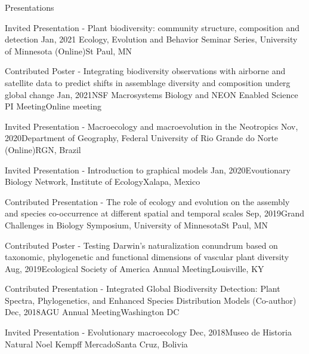 \documentclass{resume} %
\begin{document}
\begin{rSection}{Presentations}
\begin{sSubsection}{Invited Presentation - Plant biodiversity: community structure, composition and detection}{ }{Jan, 2021}{ Ecology, Evolution and Behavior Seminar Series, University of Minnesota (Online)}{St Paul, MN}
\end{sSubsection}

\begin{sSubsection}{Contributed Poster - Integrating biodiversity observations with airborne and satellite data to predict shifts in assemblage diversity and composition underg global change}{ }{Jan, 2021}{NSF Macrosystems Biology and NEON Enabled Science PI Meeting}{Online meeting}
\end{sSubsection}

\begin{sSubsection}{Invited Presentation - Macroecology and macroevolution in the Neotropics}{ }{Nov, 2020}{Department of Geography, Federal University of Rio Grande do Norte (Online)}{RGN, Brazil}
\end{sSubsection}

\begin{sSubsection}{Invited Presentation - Introduction to graphical models}{ }{Jan, 2020}{Evoutionary Biology Network, Institute of Ecology}{Xalapa, Mexico}
\end{sSubsection}

\begin{sSubsection}{Contributed Presentation - The role of ecology and evolution on the assembly and species co-occurrence at different spatial and temporal scales}{ }{Sep, 2019}{Grand Challenges in Biology Symposium, University of Minnesota}{St Paul, MN}
\end{sSubsection}

\begin{sSubsection}{Contributed Poster - Testing Darwin's naturalization conundrum based on taxonomic, phylogenetic and functional dimensions of vascular plant diversity}{ }{Aug, 2019}{Ecological Society of America Annual Meeting}{Louisville, KY}
\end{sSubsection}


\begin{sSubsection}{Contributed Presentation - Integrated Global Biodiversity Detection: Plant Spectra, Phylogenetics, and Enhanced Species Distribution Models}{ (Co-author) }{Dec, 2018}{AGU Annual Meeting}{Washington DC}
\end{sSubsection}

\begin{sSubsection}{Invited Presentation - Evolutionary macroecology}{ }{Dec, 2018}{Museo de Historia Natural Noel Kempff Mercado}{Santa Cruz, Bolivia}
\end{sSubsection}


\end{rSection}
\end{document}
